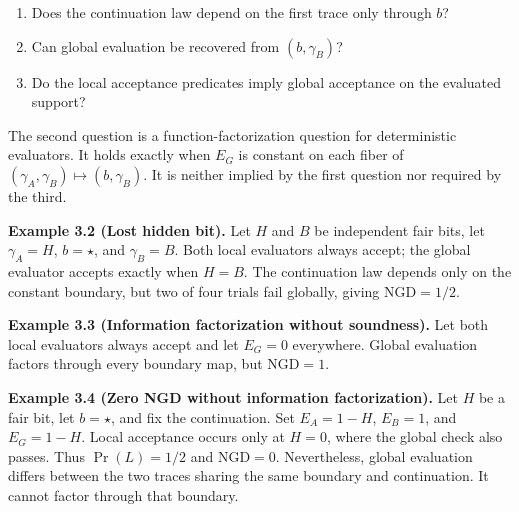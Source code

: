 \documentclass[
  10pt,
]{article}
\begin{document}
\begin{enumerate}
\def\labelenumi{\arabic{enumi}.}
\item
  Does the continuation law depend on the first trace only through \hypertarget{math-E0037-0038}{}{\(b\)}?
\item
  Can global evaluation be recovered from \hypertarget{math-E0038-0039}{}{\((b,\gamma_B)\)}?
\item
  Do the local acceptance predicates imply global acceptance on the evaluated support?
\end{enumerate}

The second question is a function-factorization question for deterministic evaluators. It holds exactly when \hypertarget{math-E0039-0040}{}{\(E_G\)} is constant on each fiber of \hypertarget{math-E0040-0041}{}{\((\gamma_A,\gamma_B)\mapsto(b,\gamma_B)\)}. It is neither implied by the first question nor required by the third.

\textbf{Example 3.2 (Lost hidden bit).} Let \hypertarget{math-E0041-0042}{}{\(H\)} and \hypertarget{math-E0042-0043}{}{\(B\)} be independent fair bits, let \hypertarget{math-E0043-0044}{}{\(\gamma_A=H\)}, \hypertarget{math-E0044-0045}{}{\(b=\star\)}, and \hypertarget{math-E0045-0046}{}{\(\gamma_B=B\)}. Both local evaluators always accept; the global evaluator accepts exactly when \hypertarget{math-E0046-0047}{}{\(H=B\)}. The continuation law depends only on the constant boundary, but two of four trials fail globally, giving \hypertarget{math-E0047-0048}{}{\(\mathrm{NGD}=1/2\)}.

\textbf{Example 3.3 (Information factorization without soundness).} Let both local evaluators always accept and let \hypertarget{math-E0048-0049}{}{\(E_G=0\)} everywhere. Global evaluation factors through every boundary map, but \hypertarget{math-E0049-0050}{}{\(\mathrm{NGD}=1\)}.

\textbf{Example 3.4 (Zero NGD without information factorization).} Let \hypertarget{math-E0041-0051}{}{\(H\)} be a fair bit, let \hypertarget{math-E0044-0052}{}{\(b=\star\)}, and fix the continuation. Set \hypertarget{math-E0050-0053}{}{\(E_A=1-H\)}, \hypertarget{math-E0051-0054}{}{\(E_B=1\)}, and \hypertarget{math-E0052-0055}{}{\(E_G=1-H\)}. Local acceptance occurs only at \hypertarget{math-E0053-0056}{}{\(H=0\)}, where the global check also passes. Thus \hypertarget{math-E0054-0057}{}{\(\Pr(L)=1/2\)} and \hypertarget{math-E0029-0058}{}{\(\mathrm{NGD}=0\)}. Nevertheless, global evaluation differs between the two traces sharing the same boundary and continuation. It cannot factor through that boundary.
\end{document}
